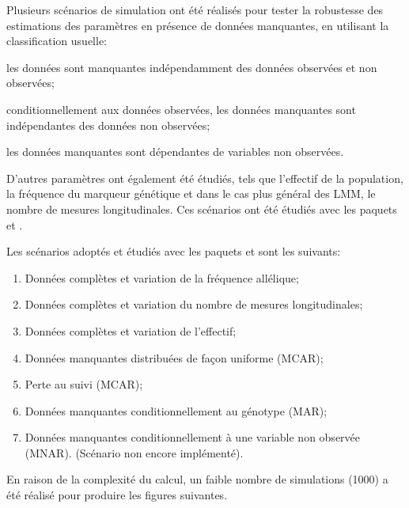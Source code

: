 \documentclass[11pt, a4paper]{article}
\begin{document}
\par{Plusieurs scénarios de simulation ont été réalisés pour tester la robustesse des estimations des paramètres
en présence de données manquantes, en utilisant la classification usuelle:}
\begin{description}
    \addtolength{\itemindent}{1cm}
    \item[MCAR (missing completely at random):] les données sont manquantes indépendamment des données observées et non observées;
    \item[MAR (missing at random):] conditionnellement aux données observées, les données manquantes sont indépendantes des données non observées;
    \item[MNAR (missing not at random):] les données manquantes sont dépendantes de variables non observées.
\end{description}
\par{D’autres paramètres ont également été étudiés, tels que l’effectif de la population,
la fréquence du marqueur génétique et dans le cas plus général des LMM, le nombre de mesures longitudinales.
Ces scénarios ont été étudiés avec les paquets  et .}
\par{Les scénarios adoptés et étudiés avec les paquets  et  sont les suivants:
\begin{enumerate}
    \addtolength{\itemindent}{1cm}
    \item Données complètes et variation de la fréquence allélique;
    \item Données complètes et variation du nombre de mesures longitudinales;
    \item Données complètes et variation de l'effectif;
    \item Données manquantes distribuées de façon uniforme (MCAR);
    \item Perte au suivi (MCAR);
    \item Données manquantes conditionnellement au génotype (MAR);
    \item Données manquantes conditionnellement à une variable non observée (MNAR). (Scénario non encore implémenté).
\end{enumerate}
}
\par{En raison de la complexité du calcul, un faible nombre de simulations (1000) a été réalisé pour produire
les figures suivantes.}
\end{document}
